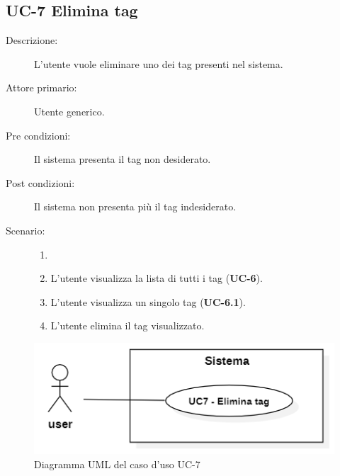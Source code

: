 \subsection{UC-7 Elimina tag}
\begin{description}
    \item[Descrizione:] L'utente vuole eliminare uno dei tag presenti nel sistema.
    \item[Attore primario:] Utente generico.
    \item[Pre condizioni:] Il sistema presenta il tag non desiderato.
    \item[Post condizioni:] Il sistema non presenta più il tag indesiderato.
    \item[Scenario:]
    \begin{enumerate}
        \item[]
        \item L’utente visualizza la lista di tutti i tag (\textbf{UC-6}).
        \item L'utente visualizza un singolo tag (\textbf{UC-6.1}).
        \item L'utente elimina il tag visualizzato.
    \end{enumerate}
\end{description}

\begin{figure}[H]
    \centering
    \includegraphics[width=0.8\linewidth]{UC7.png} %
    \caption{Diagramma UML del caso d'uso UC-7}
    \label{fig:UC9}
\end{figure}

